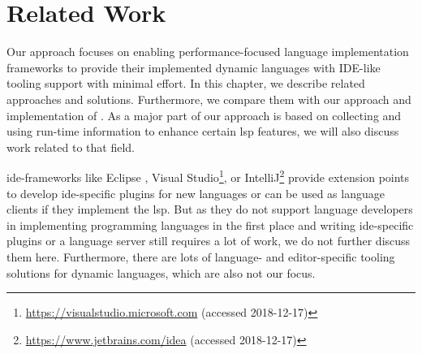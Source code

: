 

\section{Related Work}
\label{cha:relatedwork}


Our approach focuses on enabling performance-focused language implementation frameworks to provide their implemented dynamic languages with IDE-like tooling support with minimal effort. In this chapter, we describe related approaches and solutions. Furthermore, we compare them with our approach and implementation of \graallsp. As a major part of our approach is based on collecting and using run-time information to enhance certain \ac{lsp} features, we will also discuss work related to that field.


\ac{ide}-frameworks like Eclipse \cite{des2004eclipse}, Visual Studio\footnote{\url{https://visualstudio.microsoft.com} (accessed 2018-12-17)}, or IntelliJ\footnote{\url{https://www.jetbrains.com/idea} (accessed 2018-12-17)} provide extension points to develop \ac{ide}-specific plugins for new languages or can be used as language clients if they implement the \ac{lsp}. But as they do not support language developers in implementing programming languages in the first place and writing \ac{ide}-specific plugins or a language server still requires a lot of work, we do not further discuss them here. Furthermore, there are lots of language- and editor-specific tooling solutions for dynamic languages, which are also not our focus.

